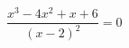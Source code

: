 \begin{ex}[type=equation]
	\begin{condition}
		$\dfrac{x^3 - 4x^2 + x +6}{(x - 2)^2} =0$
	\end{condition}
\end{ex}